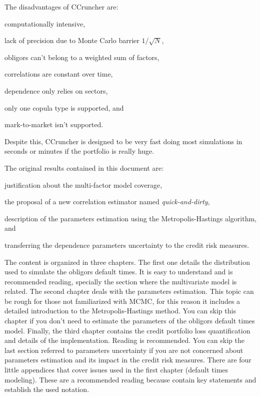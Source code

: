 \documentclass[11pt,fleqn]{book} %
\begin{document}
The disadvantages of CCruncher are: 
\begin{inparaenum}[1)]
	\item computationally intensive,
	\item lack of precision due to Monte Carlo barrier $1/\sqrt{N}$,
	\item obligors can't belong to a weighted sum of factors,
	\item correlations are constant over time,
	\item dependence only relies on sectors,
	\item only one copula type is supported, and
	\item mark-to-market isn't supported.
\end{inparaenum}
Despite this, CCruncher is designed to be very fast doing most simulations
in seconds or minutes if the portfolio is really huge.

The original results contained in this document are: 
\begin{inparaenum}[1)]
	\item justification about the multi-factor model coverage,
	\item the proposal of a new correlation estimator named \emph{quick-and-dirty},
	\item description of the parameters estimation using the Metropolis-Hastings algorithm, and
	\item transferring the dependence parameters uncertainty to the credit risk measures.
\end{inparaenum}

The content is organized in three chapters. The first one details the 
distribution used to simulate the obligors default times. It is easy to 
understand and is recommended reading, specially the section where the 
multivariate model is related. The second chapter deals with the parameters 
estimation. This topic can be rough for those not familiarized 
with MCMC, for this reason it includes a detailed introduction to the 
Metropolis-Hastings method. You can skip this chapter if you don't need 
to estimate the parameters of the obligors default times model. Finally, the 
third chapter contains the credit portfolio loss quantification and details 
of the implementation. Reading is recommended. You can skip the last 
section referred to parameters uncertainty if you are not concerned about 
parameters estimation and its impact in the credit risk measures.
There are four little appendices that cover issues used in the first 
chapter (default times modeling). These are a recommended reading because
contain key statements and establish the used notation.
\end{document}
